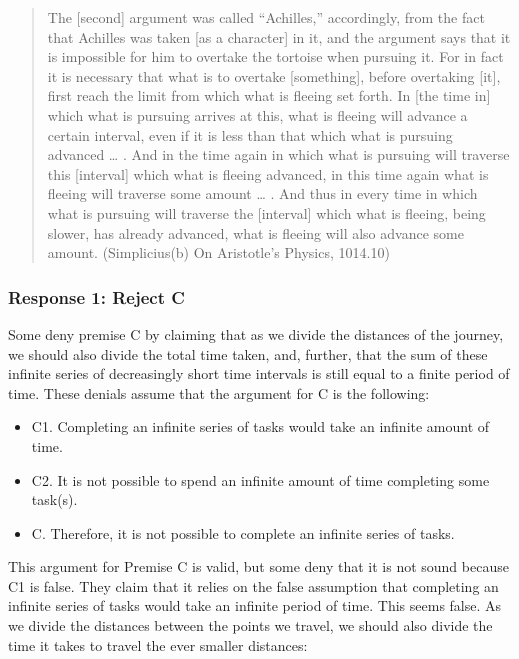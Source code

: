 \documentclass[]{article}
\begin{document}
\begin{quote}
The {[}second{]} argument was called ``Achilles,'' accordingly, from the
fact that Achilles was taken {[}as a character{]} in it, and the
argument says that it is impossible for him to overtake the tortoise
when pursuing it. For in fact it is necessary that what is to overtake
{[}something{]}, before overtaking {[}it{]}, first reach the limit from
which what is fleeing set forth. In {[}the time in{]} which what is
pursuing arrives at this, what is fleeing will advance a certain
interval, even if it is less than that which what is pursuing advanced
\ldots{} . And in the time again in which what is pursuing will traverse
this {[}interval{]} which what is fleeing advanced, in this time again
what is fleeing will traverse some amount \ldots{} . And thus in every
time in which what is pursuing will traverse the {[}interval{]} which
what is fleeing, being slower, has already advanced, what is fleeing
will also advance some amount. (Simplicius(b) On Aristotle's Physics,
1014.10)
\end{quote}

\subsubsection{Response 1: Reject C}\label{response-1-reject-c}

Some deny premise C by claiming that as we divide the distances of the
journey, we should also divide the total time taken, and, further, that
the sum of these infinite series of decreasingly short time intervals is
still equal to a finite period of time. These denials assume that the
argument for C is the following:

\begin{itemize}
\item
  C1. Completing an infinite series of tasks would take an infinite
  amount of time.
\item
  C2. It is not possible to spend an infinite amount of time completing
  some task(s).
\item
  C. Therefore, it is not possible to complete an infinite series of
  tasks.
\end{itemize}

This argument for Premise C is valid, but some deny that it is not sound
because C1 is false. They claim that it relies on the false assumption
that completing an infinite series of tasks would take an infinite
period of time. This seems false. As we divide the distances between the
points we travel, we should also divide the time it takes to travel the
ever smaller distances:
\end{document}
